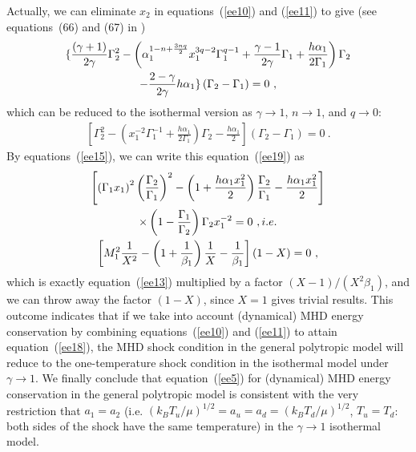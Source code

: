\documentclass[fleqn,usenatbib]{mnras}
\begin{document}
Actually, we can eliminate $x_{2}$ in equations~(\ref{ee10}) and (\ref{ee11}) to give (see equations~(66) and (67) in \citet{wang2008dynamic})
\begin{gather}
\lbrace \frac{(\gamma+1)}{2\gamma}\Gamma_{2}^{2}-\left(\alpha_{1}^{1-n+\frac{3nq}{2}}x_{1}^{3q-2}\Gamma_{1}^{q-1}+\frac{\gamma-1}{2\gamma}\Gamma_{1}+\frac{h\alpha_{1}}{2\Gamma_{1}}\right)\Gamma_{2}\notag\\
-\frac{2-\gamma}{2\gamma}h\alpha_{1}\rbrace \left(\Gamma_{2}-\Gamma_{1}\right)=0\ ,\label{ee18}
\end{gather}
which can be reduced to the isothermal version as $\gamma\rightarrow 1$, $n\rightarrow 1$, and $q\rightarrow 0$:
\begin{gather}
\left[\Gamma_{2}^{2}-\left(x_{1}^{-2}\Gamma_{1}^{-1}+\frac{h\alpha_{1}}{2\Gamma_{1}}\right)\Gamma_{2}-\frac{h\alpha_{1}}{2}\right]\left(\Gamma_{2}-\Gamma_{1}\right)=0\ .\label{ee19}
\end{gather}
By equations~(\ref{ee15}), we can write this equation~(\ref{ee19}) as
\begin{gather}
\left[\left(\Gamma_{1}x_{1}\right)^{2}\left(\frac{\Gamma_{2}}{\Gamma_{1}}\right)^{2}-\left(1+\frac{h\alpha_{1}x_{1}^{2}}{2}\right)\frac{\Gamma_{2}}{\Gamma_{1}}-\frac{h\alpha_{1}x_{1}^{2}}{2}\right]\notag\\
\times \left(1-\frac{\Gamma_{1}}{\Gamma_{2}}\right)\Gamma_{2}x_{1}^{-2}=0\ , i.e.\notag\\
\left[M_{1}^{2}\frac{1}{X^{2}}-\left(1+\frac{1}{\beta_{1}}\right)\frac{1}{X}-\frac{1}{\beta_{1}}\right](1-X)=0\ ,\label{ee20}
\end{gather}
which is exactly equation~(\ref{ee13}) multiplied by a factor $(X-1)/\left(X^{2}\beta_{1}\right)$, and we can throw away the factor $\left(1-X\right)$, since $X=1$ gives trivial results. This outcome indicates that if we take into account (dynamical) MHD energy conservation by combining equations~(\ref{ee10}) and (\ref{ee11}) to attain equation~(\ref{ee18}), the MHD shock condition in the general polytropic model will reduce to the one-temperature shock condition in the isothermal model under $\gamma\rightarrow 1$. We finally conclude that equation~(\ref{ee5}) for (dynamical) MHD energy conservation in the general polytropic model is consistent with the very restriction that $a_{1}=a_{2}$ (i.e. $\left(k_{B}T_{u}/\mu\right)^{1/2}=a_{u}=a_{d}=\left(k_{B}T_{d}/\mu\right)^{1/2}$, $T_{u}=T_{d}$: both sides of the shock have the same temperature) in the $\gamma\rightarrow 1$ isothermal model. 
\end{document}
